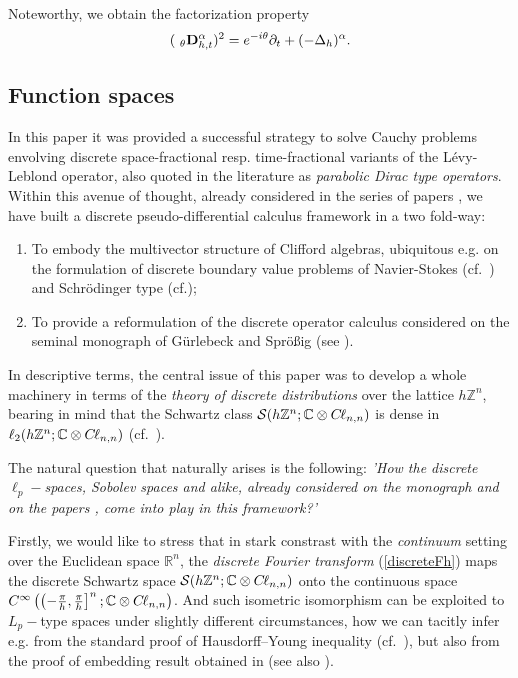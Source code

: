 \documentclass{elsarticle}
\newcommand{\BR}{{\mathbb R}}
\newcommand{\BC}{{\mathbb C}}
\newcommand{\BZ}{{\mathbb Z}}
\newcommand{\Qh}{\left(-\frac{\pi}{h},\frac{\pi}{h}\right]^n}
\newcommand{\cl}{C \kern -0.1em \ell}
\begin{document}
Noteworthy, we obtain the factorization property
$$({~}_\theta{\bf D}_{h,t}^\alpha)^2=e^{-i\theta}\partial_t+(-\Delta_h)^\alpha.$$

\subsection{Function spaces}

In this paper it was provided a successful strategy to solve Cauchy problems envolving discrete space-fractional resp. time-fractional variants of the L\'evy-Leblond operator, also quoted in the literature as {\it parabolic Dirac type operators}. Within this avenue of thought, already considered in the series of papers \cite{F19b,F19,F20}, we have built a discrete pseudo-differential calculus framework in a two fold-way: 
\begin{enumerate}
	\item To embody the multivector structure of Clifford algebras, ubiquitous e.g. on the formulation of discrete boundary value problems of Navier-Stokes (cf.~\cite{faustino2006difference}) and Schr\"odinger type (cf.\cite{CFV08});
	\item To provide a reformulation of the discrete operator calculus considered on the seminal monograph \cite{gurlebeck1997quaternionic} of G\"urlebeck and Spr\"o\ss ig (see \cite[Chapter 5]{gurlebeck1997quaternionic}).
\end{enumerate}

In descriptive terms, the central issue of this paper was to develop a whole machinery in terms of the {\it theory of discrete distributions} over the lattice $h\BZ^n$, bearing in mind that the Schwartz class $\mathcal{S}(h\BZ^n;\BC\otimes \cl_{n,n})$ is dense in $\ell_2(h\BZ^n;\BC\otimes\cl_{n,n})$ (cf.~\cite[Exercise 3.1.15 of p.~302]{RuzhanskyT10}). 

The natural question that naturally arises is the following: {\it 'How the discrete $\ell_p-$spaces, Sobolev spaces and alike, already considered on the monograph \cite{gurlebeck1997quaternionic} and on the papers \cite{faustino2006difference,CFV08}, come into play in this framework?'} 

Firstly, we would like to stress that in stark constrast with the {\it continuum} setting over the Euclidean space $\BR^n$, the {\it discrete Fourier transform} (\ref{discreteFh}) maps the discrete Schwartz space $\mathcal{S}(h\BZ^n;\BC\otimes \cl_{n,n})$ onto the continuous space $C^\infty\left(\Qh;\BC \otimes \cl_{n,n}\right)$. And such isometric isomorphism can be exploited to $L_p-$type spaces under slightly different circumstances, how we can tacitly infer e.g. from the standard proof of Hausdorff–Young inequality (cf.~\cite[Corollary 3.1.24]{RuzhanskyT10}), but also from the proof of embedding result obtained in \cite[LEMMA 3.1]{faustino2006difference} (see also \cite[p.~476]{hytonen2016analysis}).
\end{document}

